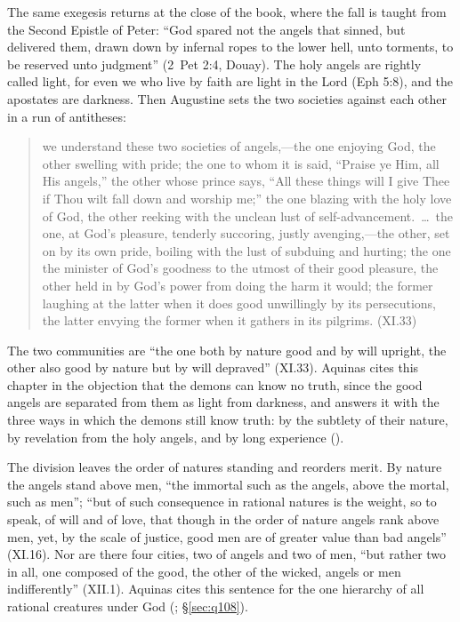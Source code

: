 The same exegesis returns at the close of the book, where the fall is
taught from the Second Epistle of Peter: ``God spared not the angels that
sinned, but delivered them, drawn down by infernal ropes to the lower
hell, unto torments, to be reserved unto judgment'' (2~Pet 2:4, Douay).
The holy angels are rightly called light, for even we who live by faith
are light in the Lord (Eph 5:8), and the apostates are darkness. Then
Augustine sets the two societies against each other in a run of
antitheses:
\begin{quote}
we understand these two societies of angels,---the one enjoying God, the
other swelling with pride; the one to whom it is said, ``Praise ye Him,
all His angels,'' the other whose prince says, ``All these things will I
give Thee if Thou wilt fall down and worship me;'' the one blazing with
the holy love of God, the other reeking with the unclean lust of
self-advancement.~\dots\ the one, at God's pleasure,
tenderly succoring, justly avenging,---the other, set on by its own pride,
boiling with the lust of subduing and hurting; the one the minister of
God's goodness to the utmost of their good pleasure, the other held in by
God's power from doing the harm it would; the former laughing at the
latter when it does good unwillingly by its persecutions, the latter
envying the former when it gathers in its pilgrims. (XI.33)
\end{quote}
The two communities are ``the one both by nature good and by will
upright, the other also good by nature but by will depraved'' (XI.33).
Aquinas cites this chapter in the objection that the demons can
know no truth, since the good angels are separated from them as light
from darkness, and answers it with the three ways in which the demons
still know truth: by the subtlety of their nature, by revelation from the
holy angels, and by long experience ().

The division leaves the order of natures standing and reorders merit. By
nature the angels
stand above men, ``the immortal such as the angels, above the mortal,
such as men''; ``but of such consequence in rational natures is the
weight, so to speak, of will and of love, that though in the order of
nature angels rank above men, yet, by the scale of justice, good men are
of greater value than bad angels'' (XI.16). Nor are there four cities,
two of angels and two of men, ``but rather two in all, one composed of
the good, the other of the wicked, angels or men indifferently'' (XII.1).
Aquinas cites this sentence for the one hierarchy of all rational
creatures under God (; \S\ref{sec:q108}).

